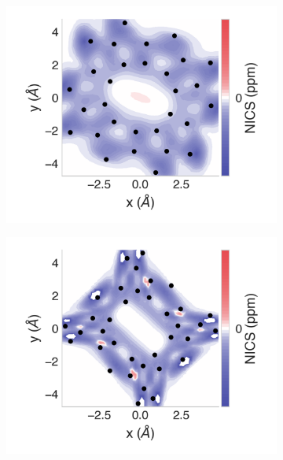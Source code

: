 \documentclass[
	fontsize=10pt, %
	twoside=true, %
	numbers=noenddot, %
]{kaobook}
\begin{document}
\begin{figure}[h]
\begin{subfigure}{5.5cm}\centering\includegraphics{se10-2d}\end{subfigure}%
\begin{subfigure}{5.5cm}\centering\includegraphics{se12-2d}\end{subfigure}

\end{figure}
\end{document}

